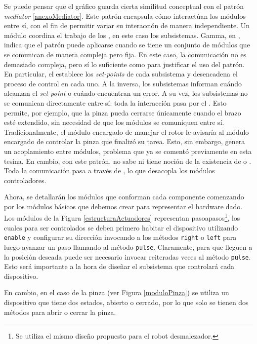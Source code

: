 Se puede pensar que el gráfico guarda cierta similitud conceptual con el patrón \textit{mediator} \ref{anexoMediator}. Este patrón encapsula cómo interactúan los módulos entre sí, con el fin de permitir variar su interacción de manera independiente. Un módulo \Mediator coordina el trabajo de los \College, en este caso los subsistemas. Gamma, en \cite{Gamma:1995:DPE:186897}, indica que el patrón puede aplicarse cuando se tiene un conjunto de módulos que se comunican de manera compleja pero fija. En este caso, la comunicación no es demasiado compleja, pero sí lo suficiente como para justificar el uso del patrón. En particular, el \MainController establece los \textit{set-points} de cada subsistema y desencadena el proceso de control en cada uno. A la inversa, los subsistemas informan cuándo alcanzan el \textit{set-point} o cuándo encuentran un error. A su vez, los subsistemas no se comunican directamente entre sí: toda la interacción pasa por el \MainController. Esto permite, por ejemplo, que la pinza pueda cerrarse únicamente cuando el brazo esté extendido, sin necesidad de que los módulos se comuniquen entre sí. Tradicionalmente, el módulo encargado de manejar el rotor le avisaría al módulo encargado de controlar la pinza que finalizó su tarea. Esto, sin embargo, genera un acoplamiento entre módulos, problema que ya se comentó previamente en esta tesina. En cambio, con este patrón, \RotorCtrl no sabe ni tiene noción de la existencia de \PinzaCtrl o \ExtensorCtrl. Toda la comunicación pasa a través de \MainController, lo que desacopla los módulos controladores.

Ahora, se detallarán los módulos que conforman cada componente comenzando por los módulos básicos que debemos crear para representar el hardware dado. Los módulos de la Figura \ref{estructuraActuadores} representan \glspl{pasoapaso}\footnote{Se utiliza el mismo diseño propuesto para el robot desmalezador\cite{paperPomponio}.}, los cuales para ser controlados se deben primero habitar el dispositivo utilizando \verb|enable| y configurar su dirección invocando a los métodos \verb|right| o \verb|left| para luego avanzar un paso llamando al método \verb|pulse|. Claramente, para que lleguen a la posición deseada puede ser necesario invocar reiteradas veces al método \verb|pulse|. Esto será importante a la hora de diseñar el subsistema que controlará cada dispositivo.

En cambio, en el caso de la pinza (ver Figura \ref{moduloPinza}) se utiliza un dispositivo que tiene dos estados, abierto o cerrado, por lo que solo se tienen dos métodos para abrir o cerrar la pinza.

